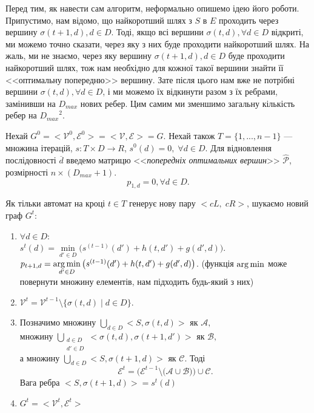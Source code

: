 Перед тим, як навести сам алгоритм, неформально опишемо ідею його роботи.
Припустимо, нам відомо, що найкоротший шлях з $S$ в $E$ проходить через вершину $ \sigma(t+1, d), d \in D $. 
Тоді, якщо всі вершини $ \sigma(t, d), \forall d \in D $ відкриті, ми можемо точно сказати, через яку з них буде проходити найкоротший шлях. На жаль, ми не знаємо, через яку вершину $ \sigma(t+1, d), d \in D $ буде проходити найкоротший шлях, тож нам необхідно для кожної такої вершини знайти її <<оптимальну попередню>> вершину. Зате після цього нам вже не потрібні вершини $ \sigma(t, d), \forall d \in D $, і ми можемо їх відкинути разом з їх ребрами, замінивши на $D_{max}$ нових ребер.
Цим самим ми зменшимо загальну кількість ребер на ${D_{max}}^2$.

Нехай $G^0 = <\mathcal{V}^0, \mathcal{E}^0> = <\mathcal{V}, \mathcal{E}> = G $. Нехай також $ T = \{1, ..., n-1\} $ --- множина ітерацій, $ s: T \times D \rightarrow R $, $s^0(d) = 0, \; \forall d \in D $. Для відновлення послідовності 
$\overline{d}$ введемо матрицю <<\textit{попередніх оптимальних вершин}>> $\hat{\mathcal{P}}$, розмірності $n \times (D_{max} + 1)$.  $$p_{1,d} = 0, \forall d \in D. $$

Як тільки автомат на кроці $ t \in T $ генерує нову пару $<cL, \;cR>$, шукаємо новий граф $G^t$:
\begin{enumerate}
	\item 
		$\forall d \in D :$\\
		$s^t(d) = \min\limits_{d' \in D} \big( s^{(t-1)}(d') + h(t, d') + g(d', d) \big).$\\
		$p_{t+1,d} = \operatorname*{arg\,min}\limits_{d' \in D}{\big( s^{(t-1)}(d') + h(t, d') + g(d', d) \big) }$.
		(функція $ \operatorname*{arg\,min} $ може повернути множину елементів, нам підходить будь-який з них)
	\item 
		$\mathcal{V}^t = \mathcal{V}^{t-1} \setminus \{ \sigma(t, d) \; | \; d \in D \}.$
	\item %
		Позначимо множину $ \bigcup\limits_{d \in D} <S, \sigma(t, d) > $ як $ \mathcal{A},$ \\
		множину $ \bigcup\limits_{\substack{d \in D \\ d' \in D}} <\sigma(t, d), \sigma(t+1, d') > $ як $ \mathcal{B},$ \\
		а множину $ \bigcup\limits_{d \in D} <S, \sigma(t+1, d) > $ як $ \mathcal{C}. $ Тоді 
		$$\mathcal{E}^t = \Big( \mathcal{E}^{t-1} \setminus \big( \mathcal{A} \cup \mathcal{B} \big) \Big) \cup \mathcal{C}.$$
		Вага ребра $ <S, \sigma(t+1, d) > = s^t(d)$ %
	\item 
		$G^t = <\mathcal{V}^t, \mathcal{E}^t> $ \\
\end{enumerate}

